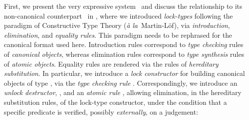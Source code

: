 \documentclass[submission,copyright,creativecommons]{eptcs}
\theoremstyle{plain}
\theoremstyle{definition}
\newcommand{\LLFP}  {\mbox{}}
\newcommand{\CLLFP} {\mbox{}}
\newcommand {\ala}       {{\textit{\`a la}}}
\begin{document}
First, we present the very expressive system \CLLFP\ and discuss the
relationship to its non-canonical counterpart \LLFP\ in \cite{HLMS15},
where we introduced \emph{lock-types} following the paradigm of
Constructive Type Theory (\ala\ Martin-L\"of), via
\emph{introduction}, \emph{elimination}, and \emph{equality rules}.
This paradigm needs to be rephrased for the canonical format used
here. Introduction rules correspond to \emph{type checking} rules of
\emph{canonical objects}, whereas elimination rules correspond to
\emph{type synthesis} rules of \emph{atomic objects}. Equality rules
are rendered via the rules of \emph{hereditary substitution}.  In
particular, we introduce a \emph{lock constructor} for building
canonical objects  of type
, via the \emph{type checking rule}
. Correspondingly, we introduce an \emph{unlock
  destructor}, , and an \emph{atomic rule}
, allowing elimination, in the hereditary substitution rules, of
the lock-type constructor, under the condition that a specific
predicate  is verified, possibly \emph{externally}, on a
judgement:
\end{document}
